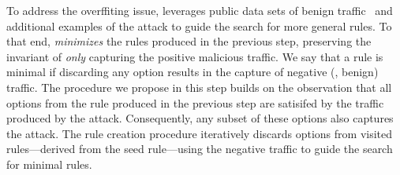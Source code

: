 \documentclass[sigconf,review, anonymous]{acmart}
\begin{document}

To address the overffiting issue, \tname{} leverages public data sets
of benign traffic~\cite{tcpreplay} and additional examples of the
attack to guide the search for more general rules. To that end,
\tname{} \emph{minimizes} the rules produced in the previous step,
preserving the invariant of \emph{only} capturing the positive
malicious traffic. We say that a rule is minimal if discarding any
option results in the capture of negative (\ie{}, benign) traffic.
The procedure we propose in this step builds on the observation that
all options from the rule produced in the previous step are satisifed
by the traffic produced by the attack. Consequently, any subset of
these options also captures the attack. The rule creation procedure
iteratively discards options from visited rules---derived from the
seed rule---using the negative traffic to guide the search for minimal
rules.
\end{document}
